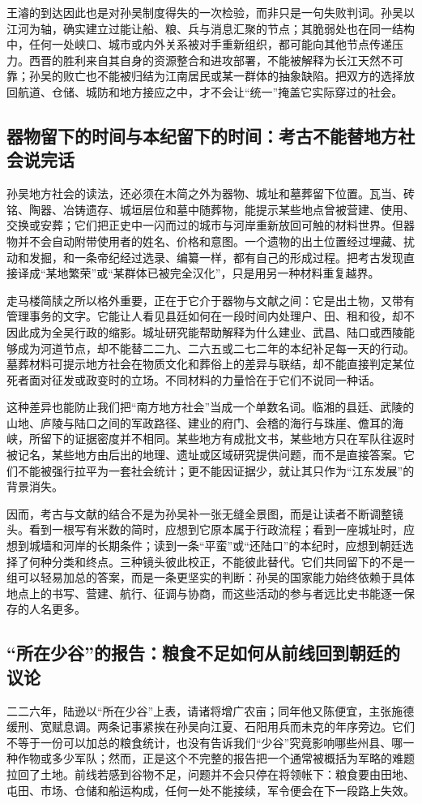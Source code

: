 王濬的到达因此也是对孙吴制度得失的一次检验，而非只是一句失败判词。孙吴以江河为轴，确实建立过能让船、粮、兵与消息汇聚的节点；其脆弱处也在同一结构中，任何一处峡口、城市或内外关系被对手重新组织，都可能向其他节点传递压力。西晋的胜利来自其自身的资源整合和进攻部署，不能被解释为长江天然不可靠；孙吴的败亡也不能被归结为江南居民或某一群体的抽象缺陷。把双方的选择放回航道、仓储、城防和地方接应之中，才不会让“统一”掩盖它实际穿过的社会。

\subsection{器物留下的时间与本纪留下的时间：考古不能替地方社会说完话}
孙吴地方社会的读法，还必须在木简之外为器物、城址和墓葬留下位置。瓦当、砖铭、陶器、冶铸遗存、城垣层位和墓中随葬物，能提示某些地点曾被营建、使用、交换或安葬；它们把正史中一闪而过的城市与河岸重新放回可触的材料世界。但器物并不会自动附带使用者的姓名、价格和意图。一个遗物的出土位置经过埋藏、扰动和发掘，和一条帝纪经过选录、编纂一样，都有自己的形成过程。把考古发现直接译成“某地繁荣”或“某群体已被完全汉化”，只是用另一种材料重复越界。

走马楼简牍之所以格外重要，正在于它介于器物与文献之间：它是出土物，又带有管理事务的文字。它能让人看见县廷如何在一段时间内处理户、田、租和役，却不因此成为全吴行政的缩影。城址研究能帮助解释为什么建业、武昌、陆口或西陵能够成为河道节点，却不能替二二九、二六五或二七二年的本纪补足每一天的行动。墓葬材料可提示地方社会在物质文化和葬俗上的差异与联结，却不能直接判定某位死者面对征发或政变时的立场。不同材料的力量恰在于它们不说同一种话。

这种差异也能防止我们把“南方地方社会”当成一个单数名词。临湘的县廷、武陵的山地、庐陵与陆口之间的军政路径、建业的府门、会稽的海行与珠崖、儋耳的海峡，所留下的证据密度并不相同。某些地方有成批文书，某些地方只在军队往返时被记名，某些地方由后出的地理、遗址或区域研究提供问题，而不是直接答案。它们不能被强行拉平为一套社会统计；更不能因证据少，就让其只作为“江东发展”的背景消失。

因而，考古与文献的结合不是为孙吴补一张无缝全景图，而是让读者不断调整镜头。看到一根写有米数的简时，应想到它原本属于行政流程；看到一座城址时，应想到城墙和河岸的长期条件；读到一条“平蛮”或“还陆口”的本纪时，应想到朝廷选择了何种分类和终点。三种镜头彼此校正，不能彼此替代。它们共同留下的不是一组可以轻易加总的答案，而是一条更坚实的判断：孙吴的国家能力始终依赖于具体地点上的书写、营建、航行、征调与协商，而这些活动的参与者远比史书能逐一保存的人名更多。

\subsection{“所在少谷”的报告：粮食不足如何从前线回到朝廷的议论}
二二六年，陆逊以“所在少谷”上表，请诸将增广农亩；同年他又陈便宜，主张施德缓刑、宽赋息调。两条记事紧挨在孙吴向江夏、石阳用兵而未克的年序旁边。它们不等于一份可以加总的粮食统计，也没有告诉我们“少谷”究竟影响哪些州县、哪一种作物或多少军队；然而，正是这个不完整的报告把一个通常被概括为军略的难题拉回了土地。前线若感到谷物不足，问题并不会只停在将领帐下：粮食要由田地、屯田、市场、仓储和船运构成，任何一处不能接续，军令便会在下一段路上失效。

